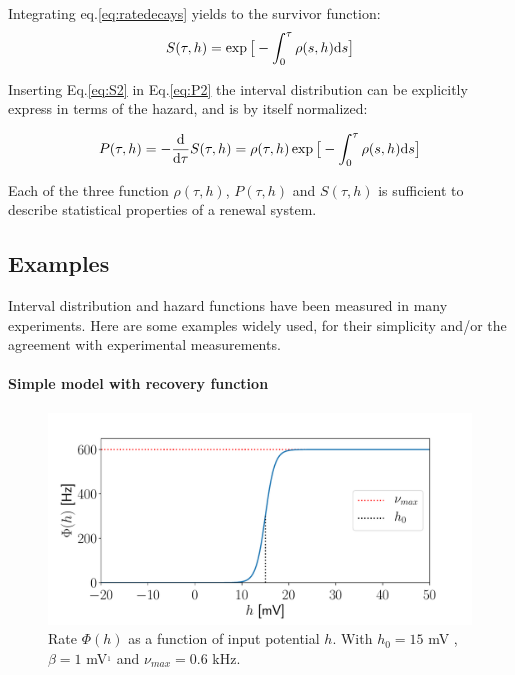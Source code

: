 \documentclass[12pt,twoside]{report}
\def \dd  {{\rm d}}
\begin{document}
Integrating eq.\ref{eq:ratedecays} yields to the survivor function:
\begin{equation}
\label{eq:S2}
S(\tau,h)=\exp\big[-\int_0^\tau\rho(s,h)\dd s\big]
\end{equation}

Inserting Eq.\eqref{eq:S2} in Eq.\eqref{eq:P2} the interval distribution can be explicitly express in terms of the hazard, and is by itself normalized:

\begin{equation}
\label{eq:P4}
P(\tau,h)=-\frac{\dd}{\dd \tau}S(\tau,h)=\rho(\tau,h)\exp\big[-\int_0^\tau\rho(s,h)\dd s\big]
\end{equation}

Each of the three function $\rho(\tau,h)$, $P(\tau,h)$ and $S(\tau,h)$ is sufficient to describe statistical properties of a renewal system.

\subsection{Examples }

Interval distribution and hazard functions have been measured in many experiments. Here are some examples widely used, for their simplicity and/or the agreement with experimental measurements.

\paragraph{Simple model with recovery function}

\begin{figure}[h!]
	\centering
	\includegraphics[width=0.8\linewidth]{phi_h.pdf}
	\caption{ Rate $\Phi(h)$ as a function of input potential $h$. With $h_0=15$ mV , $\beta=1$ mV$^{_1}$ and $\nu_{max}=0.6$ kHz.}
	\label{fig:phi_h}
\end{figure}
\end{document}
